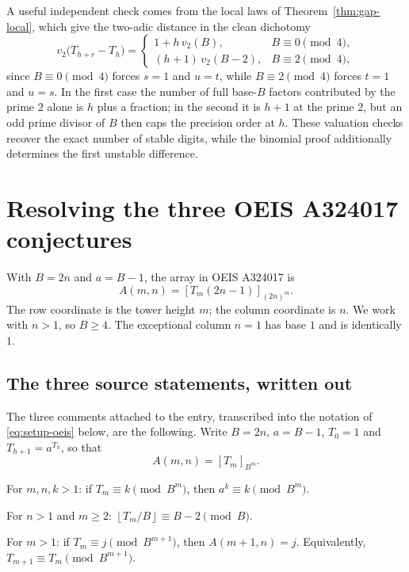 \documentclass[11pt,letterpaper]{article}
\numberwithin{equation}{section}
\theoremstyle{definition}
\theoremstyle{remark}
\newcommand{\res}[2]{\left[#1\right]_{#2}}
\newcommand{\floor}[1]{\left\lfloor #1\right\rfloor}
\begin{document}
A useful independent check comes from the local laws of Theorem~\ref{thm:gap-local}, which give the two-adic distance in the clean dichotomy
\begin{equation}\label{eq:two-cases}
 v_2\bigl(T_{h+r}-T_h\bigr)=
 \begin{cases}
 1+h\,v_2(B),&B\equiv0\pmod4,\\
 (h+1)\,v_2(B-2),&B\equiv2\pmod4,
 \end{cases}
\end{equation}
since $B\equiv0\pmod4$ forces $s=1$ and $u=t$, while $B\equiv2\pmod4$ forces $t=1$ and $u=s$. In the first case the number of full base-$B$ factors contributed by the prime $2$ alone is $h$ plus a fraction; in the second it is $h+1$ at the prime $2$, but an odd prime divisor of $B$ then caps the precision order at $h$. These valuation checks recover the exact number of stable digits, while the binomial proof additionally determines the first unstable difference.

\section{Resolving the three OEIS A324017 conjectures}\label{sec:OEIS}

With $B=2n$ and $a=B-1$, the array in OEIS A324017 \cite{OEIS324017} is
\begin{equation}\label{eq:array}
 A(m,n)=\res{T_m(2n-1)}{(2n)^m}.
\end{equation}
The row coordinate is the tower height $m$; the column coordinate is $n$. We work with $n>1$, so $B\ge4$. The exceptional column $n=1$ has base $1$ and is identically $1$.

\subsection{The three source statements, written out}\label{sec:oeis-statements}

The three comments attached to the entry, transcribed into the notation of \eqref{eq:setup-oeis} below, are the following. Write $B=2n$, $a=B-1$, $T_0=1$ and $T_{h+1}=a^{T_h}$, so that
\begin{equation}\label{eq:setup-oeis}
 A(m,n)=\res{T_m}{B^m}.
\end{equation}

\begin{description}[leftmargin=12mm,style=nextline]
\item[C1: fixed point.]
For $m,n,k>1$: if $T_m\equiv k\pmod{B^m}$, then $a^k\equiv k\pmod{B^m}$.
\item[C2: second digit.]
For $n>1$ and $m\ge2$: $\floor{T_m/B}\equiv B-2\pmod B$.
\item[C3: early stabilization.]
For $m>1$: if $T_m\equiv j\pmod{B^{m+1}}$, then $A(m+1,n)=j$. Equivalently, $T_{m+1}\equiv T_m\pmod{B^{m+1}}$.
\end{description}
\end{document}
